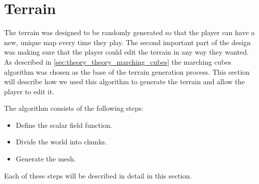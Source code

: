 \section{Terrain} \label{sec:system_architecture_terrain}
The terrain was designed to be randomly generated so that the player can have a new, unique map every time they play.
The second important part of the design was making sure that the player could edit the terrain in any way they wanted.
As described in \autoref{sec:theory_theory_marching_cubes} the marching cubes algorithm was chosen as the base of the terrain generation process.
This section will describe how we used this algorithm to generate the terrain and allow the player to edit it.

The algorithm consists of the following steps:
\begin{itemize}
    \item Define the scalar field function.
    \item Divide the world into chunks.
    \item Generate the mesh.
\end{itemize}

Each of these steps will be described in detail in this section.




